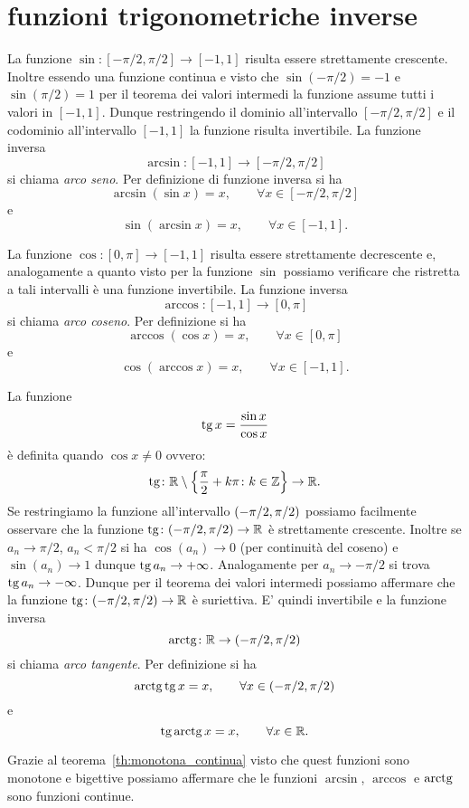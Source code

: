 
\section{funzioni trigonometriche inverse}
La funzione $\sin\colon[-\pi/2,\pi/2]\to [-1,1]$ risulta essere strettamente crescente. Inoltre essendo una funzione continua e visto che $\sin(-\pi/2)=-1$
e $\sin(\pi/2) = 1$ per il  teorema dei valori intermedi
la funzione assume tutti i valori in $[-1,1]$.
Dunque restringendo il dominio all'intervallo $[-\pi/2, \pi/2]$
e il codominio all'intervallo $[-1,1]$ la funzione risulta invertibile.
La funzione inversa
\[
  \arcsin\colon[-1,1]\to [-\pi/2, \pi/2]
\]
si chiama \emph{arco seno}. Per definizione di funzione inversa si ha
\[
  \arcsin(\sin x) = x, \qquad \forall x \in [-\pi/2, \pi/2]
\]
e
\[
  \sin(\arcsin x) = x, \qquad \forall x \in [-1, 1].
\]

La funzione $\cos \colon[0,\pi] \to [-1,1]$ risulta essere strettamente
decrescente e, analogamente a quanto visto per la funzione $\sin$
possiamo verificare che ristretta a tali intervalli è una funzione invertibile.
La funzione inversa
\[
  \arccos\colon[-1,1] \to [0,\pi]
\]
si chiama \emph{arco coseno}. Per definizione si ha
\[
  \arccos(\cos x) = x, \qquad \forall x \in [0,\pi]
\]
e
\[
    \cos(\arccos x) = x, \qquad \forall x \in [-1,1].
\]

La funzione
\[
\operatorname{tg} x = \frac{\sin x}{\cos x}
\]
è definita quando $\cos x\neq 0$ ovvero:
\[
  \operatorname{tg} \colon {\mathbb R} \setminus{\left\{ \frac \pi 2+ k\pi\colon k\in {\mathbb Z}\right\}} \to {\mathbb R}.
\]
Se restringiamo la funzione all'intervallo ${\left( -\pi/2, \pi/2 \right)}$ possiamo
facilmente osservare che la funzione $\operatorname{tg}\colon(-\pi/2,\pi/2)\to {\mathbb R}$ è strettamente crescente. Inoltre se $a_n \to \pi/2$, $a_n<\pi/2$ si ha $\cos(a_n)\to 0$ (per continuità del coseno) e $\sin(a_n)\to 1$ dunque $\operatorname{tg} a_n\to +\infty$. Analogamente per $a_n \to -\pi/2$ si trova $\operatorname{tg} a_n \to -\infty$. Dunque per il teorema dei valori intermedi possiamo affermare che la funzione $\operatorname{tg}\colon(-\pi/2,\pi/2)\to {\mathbb R}$ è suriettiva. E' quindi invertibile
e la funzione inversa
\[
  \operatorname{arctg} \colon {\mathbb R} \to (-\pi/2,\pi/2)
\]
si chiama \emph{arco tangente}. Per definizione si ha
\[
  \operatorname{arctg} \operatorname{tg} x = x, \qquad \forall x \in (-\pi/2, \pi/2)
\]
e
\[
  \operatorname{tg}\operatorname{arctg} x = x, \qquad \forall x \in {\mathbb R}.
\]

Grazie al teorema~\ref{th:monotona_continua}%
visto che quest funzioni sono monotone e bigettive
possiamo affermare che
le funzioni $\arcsin$, $\arccos$ e $\operatorname{arctg}$ sono funzioni continue.


